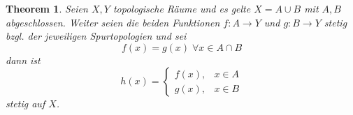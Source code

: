 \documentclass[a4paper, 12pt]{article}
\theoremstyle{plain}
\newtheorem{theorem}{Theorem}[section] %
\theoremstyle{definition}
\theoremstyle{lemma}
\theoremstyle{remark}
\theoremstyle{corollary}
\theoremstyle{example}
\begin{document}
	\begin{theorem}
		Seien $X,Y$ topologische Räume und es gelte $X = A\cup B$ mit $A,B$ abgeschlossen. Weiter seien die beiden Funktionen $f:A\to Y$ und $g:B \to Y$ stetig bzgl. der jeweiligen Spurtopologien und sei \[f(x) = g(x) \; \forall x \in A \cap B\] dann ist \[h(x) = \begin{cases}
			f(x), & x \in A\\
			g(x), & x \in B
		\end{cases}\] stetig auf $X$.
	\end{theorem}
\end{document}
